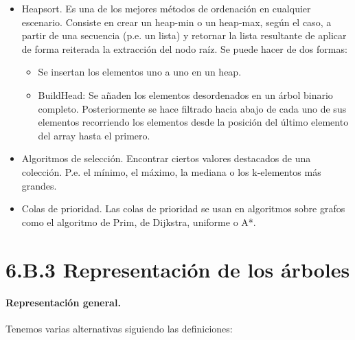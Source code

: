\begin{itemize}
\item Heapsort. Es una de los mejores métodos de ordenación en cualquier escenario. Consiste en crear un heap-min o un heap-max, según el caso, a partir de una secuencia (p.e. un lista) y retornar la lista resultante de aplicar de forma reiterada la extracción del nodo raíz. Se puede hacer de dos formas:

\begin{itemize}
\item Se insertan los elementos uno a uno en un heap.
\item BuildHead: Se añaden los elementos desordenados en un árbol binario completo. Posteriormente se hace filtrado hacia abajo de cada uno de sus elementos recorriendo los elementos desde la posición del último elemento del array hasta el primero.
\end{itemize}

\item Algoritmos de selección. Encontrar ciertos valores destacados de una colección. P.e. el mínimo, el máximo, la mediana o los k-elementos más grandes.
\item Colas de prioridad. Las colas de prioridad se usan en algoritmos sobre grafos como el algoritmo de Prim, de Dijkstra, uniforme o A*.
\end{itemize} 








\section*{6.B.3 Representación de los árboles}
\label{sec:RepresentacionArboles}


\paragraph{Representación general.}
Tenemos varias alternativas siguiendo las definiciones:

